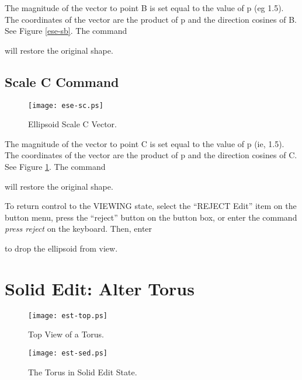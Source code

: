 The magnitude of the vector to point B is set equal to the value of p
(eg 1.5).
The coordinates of the vector are the product of p and the
direction cosines of B.  See Figure \ref{ese-sb}.  The command


will restore the original shape.

\subsection{Scale C Command}

\begin{figure}
\centering \texttt{[image: ese-sc.ps]}
\caption{Ellipsoid Scale C Vector.}
\label{ese-sc}
\end{figure}


The magnitude of the vector to point C is set equal to the value of p
(ie, 1.5).
The coordinates of the vector are the product of p and the
direction cosines of C.  See Figure \ref{ese-sc}.  The command


will restore the original shape.

To return control to the VIEWING state, select the ``REJECT Edit''
item on the button menu, press the ``reject'' button on the button box,
or enter the command {\em press reject} on the keyboard.
Then, enter


to drop the ellipsoid from view.

\section{Solid Edit: Alter Torus}

\begin{figure}
\centering \texttt{[image: est-top.ps]}
\caption{Top View of a Torus.}
\label{est-top}
\end{figure}

\begin{figure}
\centering \texttt{[image: est-sed.ps]}
\caption{The Torus in Solid Edit State.}
\label{est-sed}
\end{figure}

